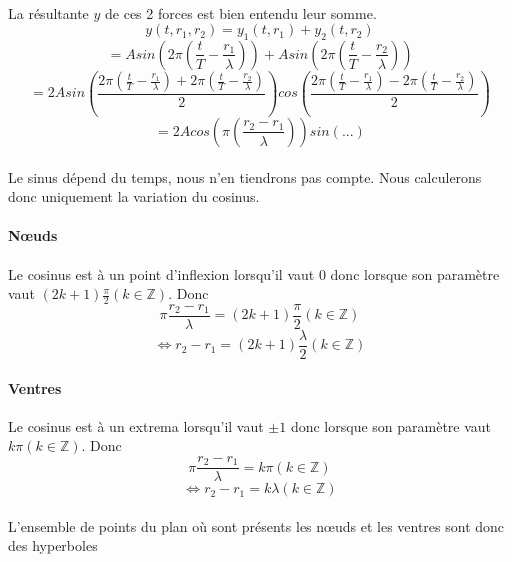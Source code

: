 \documentclass[a4paper]{article}
\begin{document}
\paragraph{}La résultante $y$ de ces 2 forces est bien entendu leur somme.
\[y(t,r_1,r_2)=y_1(t,r_1)+y_2(t,r_2)\]
\[=Asin\left(2\pi\left(\frac{t}{T}-\frac{r_1}{\lambda}\right)\right)+Asin\left(2\pi\left(\frac{t}{T}-\frac{r_2}{\lambda}\right)\right)\]
\[=2Asin\left(\frac{2\pi\left(\frac{t}{T}-\frac{r_1}{\lambda}\right)+2\pi\left(\frac{t}{T}-\frac{r_2}{\lambda}\right)}{2}\right)cos\left(\frac{2\pi\left(\frac{t}{T}-\frac{r_1}{\lambda}\right)-2\pi\left(\frac{t}{T}-\frac{r_2}{\lambda}\right)}{2}\right)\]
\[=2Acos\left(\pi\left(\frac{r_2-r_1}{\lambda}\right)\right)sin\left(...\right)\]
\paragraph{}Le sinus dépend du temps, nous n'en tiendrons pas compte. Nous calculerons donc uniquement la variation du cosinus.
\paragraph{Nœuds}Le cosinus est à un point d'inflexion lorsqu'il vaut $0$ donc lorsque son paramètre vaut $(2k+1)\frac{\pi}{2} (k \in \mathbb{Z})$. Donc
\[\pi\frac{r_2-r_1}{\lambda}=(2k+1)\frac{\pi}{2} (k \in \mathbb{Z})\]
\[\Leftrightarrow r_2-r_1=(2k+1)\frac{\lambda}{2} (k \in \mathbb{Z})\]
\paragraph{Ventres}Le cosinus est à un extrema lorsqu'il vaut $\pm1$ donc lorsque son paramètre vaut $k\pi (k \in \mathbb{Z})$. Donc
\[\pi\frac{r_2-r_1}{\lambda}=k\pi (k \in \mathbb{Z})\]
\[\Leftrightarrow r_2-r_1=k\lambda (k \in \mathbb{Z})\]
\paragraph{}L'ensemble de points du plan où sont présents les nœuds et les ventres sont donc des hyperboles
\end{document}
